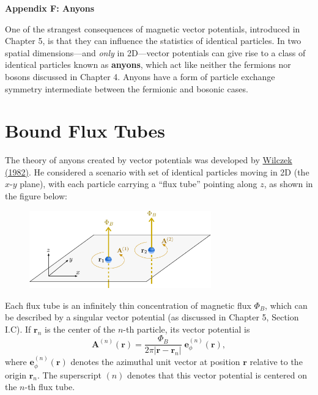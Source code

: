 \documentclass[prx,12pt]{revtex4-2}
\begin{document}
\begin{center}
{\large \textbf{Appendix F: Anyons}}
\end{center}

One of the strangest consequences of magnetic vector potentials,
introduced in Chapter 5, is that they can influence the statistics of
identical particles.  In two spatial dimensions---and \textit{only} in
2D---vector potentials can give rise to a class of identical particles
known as \textbf{anyons}, which act like neither the fermions nor
bosons discussed in Chapter 4.  Anyons have a form of particle
exchange symmetry intermediate between the fermionic and
bosonic cases.

\section{Bound Flux Tubes}

The theory of anyons created by vector potentials was developed by
\hyperref[cite:wilczek]{Wilczek (1982)}.  He considered a scenario
with set of identical particles moving in 2D (the $x$-$y$ plane), with
each particle carrying a ``flux tube'' pointing along $z$, as shown in
the figure below:

\begin{figure}[h]
  \centering\includegraphics[width=0.7\textwidth]{anyons}
\end{figure}

Each flux tube is an infinitely thin concentration of magnetic flux
$\Phi_B$, which can be described by a singular vector potential (as
discussed in Chapter 5, Section I.C).  If $\mathbf{r}_n$ is the center
of the $n$-th particle, its vector potential is
\begin{equation}
  \mathbf{A}^{(n)}(\mathbf{r}) = \frac{\Phi_B}{2\pi
    |\mathbf{r}-\mathbf{r}_n|} \; \mathbf{e}_\phi^{(n)}(\mathbf{r}),
  \label{Asolenoid}
\end{equation}
where $\mathbf{e}_\phi^{(n)}(\mathbf{r})$ denotes the azimuthal unit
vector at position $\mathbf{r}$ relative to the origin $\mathbf{r}_n$.
The superscript $(n)$ denotes that this vector potential is centered
on the $n$-th flux tube.
\end{document}
